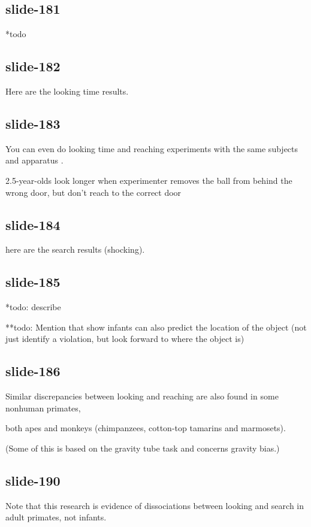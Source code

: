 \documentclass[12pt,\papersize]{extarticle}
\begin{document}
\subsection{slide-181}
*todo
 
\subsection{slide-182}
Here are the looking time results.
 
\subsection{slide-183}
You can even do looking time and reaching experiments with the same subjects and apparatus \citep{Hood:2003yg}.
 
2.5-year-olds look longer when experimenter removes the ball from behind the wrong door, but don't reach to the correct door
 
\subsection{slide-184}
here are the search results (shocking).
 
\subsection{slide-185}
*todo: describe
 
**todo: Mention that \citep{mash:2006_what} show infants can also predict the location of the object (not just identify a violation, but look forward to where the object is)
 
\subsection{slide-186}
Similar discrepancies between looking and reaching are also found in some nonhuman primates,
 
both apes and monkeys (chimpanzees, cotton-top tamarins and marmosets).
 
(Some of this is based on the gravity tube task and concerns gravity bias.)
 
\subsection{slide-190}
Note that this research is evidence of dissociations between looking and search in adult primates, not infants.
 
\end{document}
